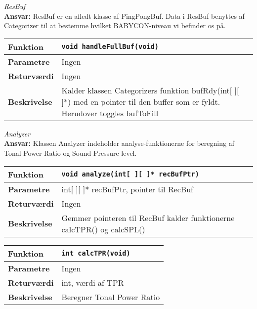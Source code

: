 \textit{ResBuf} \\
\textbf{Ansvar:} ResBuf er en afledt klasse af PingPongBuf. Data i ResBuf benyttes af Categorizer til at bestemme hvilket BABYCON-niveau vi befinder os på. 

\begin{center}
    \begin{tabular}{ | l | p{} |}
    \hline
    \textbf{Funktion}	& \verb+void handleFullBuf(void) +						\\ \hline
    \textbf{Parametre} 	& Ingen		\\ \hline
    \textbf{Returværdi}	& Ingen 								\\ \hline
    \textbf{Beskrivelse}& Kalder klassen Categorizers funktion bufRdy(int[ ][ ]*) med en pointer til den buffer som er fyldt. Herudover toggles bufToFill		\\ \hline
    \end{tabular}
\end{center} 


\textit{Analyzer} \\
\textbf{Ansvar:} Klassen Analyzer indeholder analyse-funktionerne for beregning af Tonal Power Ratio og Sound Pressure level. 

\begin{center}
    \begin{tabular}{ | l | p{} |}
    \hline
    \textbf{Funktion}	& \verb+void analyze(int[ ][ ]* recBufPtr) +						\\ \hline
    \textbf{Parametre} 	& int[ ][ ]* recBufPtr, pointer til RecBuf		\\ \hline
    \textbf{Returværdi}	& Ingen 								\\ \hline
    \textbf{Beskrivelse}& Gemmer pointeren til RecBuf kalder funktionerne calcTPR() og calcSPL()		\\ \hline
    \end{tabular}
\end{center} 

\begin{center}
    \begin{tabular}{ | l | p{} |}
    \hline
    \textbf{Funktion}	& \verb+int calcTPR(void) +						\\ \hline
    \textbf{Parametre} 	& Ingen		\\ \hline
    \textbf{Returværdi}	& int, værdi af TPR 								\\ \hline
    \textbf{Beskrivelse}& Beregner Tonal Power Ratio		\\ \hline
    \end{tabular}
\end{center} 

